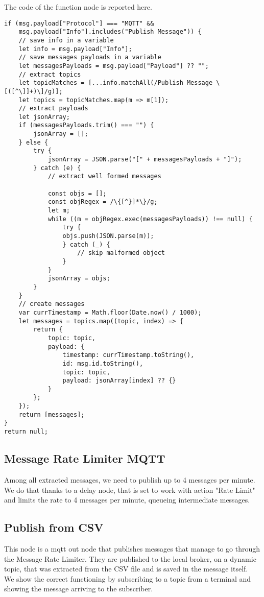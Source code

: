 The code of the function node is reported here.
\begin{verbatim}
if (msg.payload["Protocol"] === "MQTT" && 
	msg.payload["Info"].includes("Publish Message")) {
    // save info in a variable
    let info = msg.payload["Info"];
    // save messages payloads in a variable
    let messagesPayloads = msg.payload["Payload"] ?? "";
    // extract topics
    let topicMatches = [...info.matchAll(/Publish Message \[([^\]]+)\]/g)];
    let topics = topicMatches.map(m => m[1]);
    // extract payloads
    let jsonArray;
    if (messagesPayloads.trim() === "") {
        jsonArray = [];
    } else {
        try {
            jsonArray = JSON.parse("[" + messagesPayloads + "]");
        } catch (e) {
            // extract well formed messages

            const objs = [];
            const objRegex = /\{[^}]*\}/g;
            let m;
            while ((m = objRegex.exec(messagesPayloads)) !== null) {
                try {
                objs.push(JSON.parse(m));
                } catch (_) {
                    // skip malformed object
                }
            }
            jsonArray = objs;
        }
    }
    // create messages 
    var currTimestamp = Math.floor(Date.now() / 1000);
    let messages = topics.map((topic, index) => {
        return {
            topic: topic, 
            payload: {
                timestamp: currTimestamp.toString(),
                id: msg.id.toString(),
                topic: topic,
                payload: jsonArray[index] ?? {}
            }
        };
    });
    return [messages];
}
return null;
\end{verbatim}

\subsection{Message Rate Limiter MQTT}
Among all extracted messages, we need to publish up to 4 messages per minute. We do that thanks to a delay node, that is set to work with action "Rate Limit" and limits the rate to 4 messages per minute, queueing intermediate messages.  

\subsection{Publish from CSV}
This node is a mqtt out node that publishes messages that manage to go through the Message Rate Limiter. They are published to the local broker, on a dynamic topic, that was extracted from the CSV file and is saved in the message itself.\\
We show the correct functioning by subscribing to a topic from a terminal and showing the message arriving to the subscriber.

